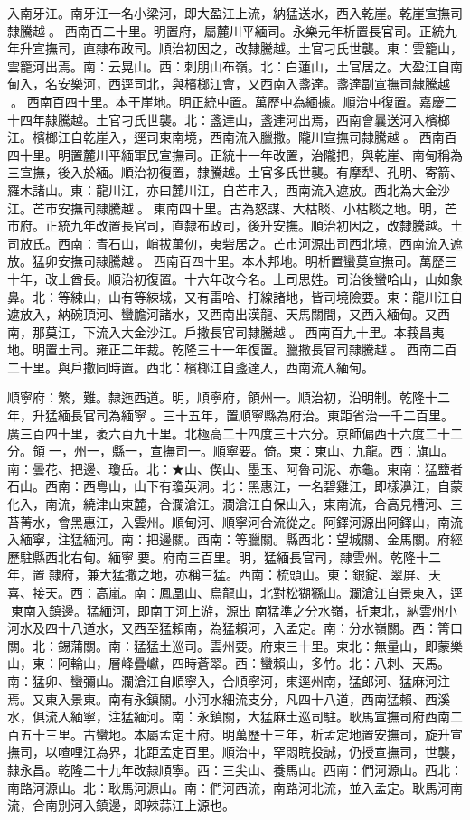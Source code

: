 \begin{pinyinscope}
入南牙江。南牙江一名小梁河，即大盈江上流，納猛送水，西入乾崖。乾崖宣撫司隸騰越。西南百二十里。明置府，屬麓川平緬司。永樂元年析置長官司。正統九年升宣撫司，直隸布政司。順治初因之，改隸騰越。土官刁氏世襲。東：雲籠山，雲籠河出焉。南：云晃山。西：刺朋山布嶺。北：白蓮山，土官居之。大盈江自南甸入，名安樂河，西逕司北，與檳榔江會，又西南入盞達。盞達副宣撫司隸騰越。西南百四十里。本干崖地。明正統中置。萬歷中為緬據。順治中復置。嘉慶二十四年隸騰越。土官刁氏世襲。北：盞達山，盞達河出焉，西南會曩送河入檳榔江。檳榔江自乾崖入，逕司東南境，西南流入臘撒。隴川宣撫司隸騰越。西南百四十里。明置麓川平緬軍民宣撫司。正統十一年改置，治隴把，與乾崖、南甸稱為三宣撫，後入於緬。順治初復置，隸騰越。土官多氏世襲。有摩犁、孔明、寄箭、羅木諸山。東：龍川江，亦曰麓川江，自芒市入，西南流入遮放。西北為大金沙江。芒市安撫司隸騰越。東南四十里。古為怒謀、大枯睒、小枯睒之地。明，芒市府。正統九年改置長官司，直隸布政司，後升安撫。順治初因之，改隸騰越。土司放氏。西南：青石山，峭拔萬仞，夷砦居之。芒市河源出司西北境，西南流入遮放。猛卯安撫司隸騰越。西南百四十里。本木邦地。明析置蠻莫宣撫司。萬歷三十年，改土酋長。順治初復置。十六年改今名。土司思姓。司治後蠻哈山，山如象鼻。北：等練山，山有等練城，又有雷哈、打線諸地，皆司境險要。東：龍川江自遮放入，納碗頂河、蠻膽河諸水，又西南出漢龍、天馬關間，又西入緬甸。又西南，那莫江，下流入大金沙江。戶撒長官司隸騰越。西南百九十里。本莪昌夷地。明置土司。雍正二年裁。乾隆三十一年復置。臘撒長官司隸騰越。西南二百二十里。與戶撒同時置。西北：檳榔江自盞達入，西南流入緬甸。

順寧府：繁，難。隸迤西道。明，順寧府，領州一。順治初，沿明制。乾隆十二年，升猛緬長官司為緬寧。三十五年，置順寧縣為府治。東距省治一千二百里。廣三百四十里，袤六百九十里。北極高二十四度三十六分。京師偏西十六度二十二分。領一，州一，縣一，宣撫司一。順寧要。倚。東：東山、九龍。西：旗山。南：曇花、把邊、瓊岳。北：★山、偰山、墨玉、阿魯司泥、赤龜。東南：猛盬者石山。西南：西粵山，山下有瓊英洞。北：黑惠江，一名碧雞江，即樣濞江，自蒙化入，南流，繞津山東麓，合瀾滄江。瀾滄江自保山入，東南流，合高見槽河、三苔菁水，會黑惠江，入雲州。順甸河、順寧河合流從之。阿鐸河源出阿鐸山，南流入緬寧，注猛緬河。南：把邊關。西南：等臘關。縣西北：望城關、金馬關。府經歷駐縣西北右甸。緬寧要。府南三百里。明，猛緬長官司，隸雲州。乾隆十二年，置隸府，兼大猛撒之地，亦稱三猛。西南：梳頭山。東：銀錠、翠屏、天喜、接天。西：高嵐。南：鳳凰山、烏龍山，北對松猢猻山。瀾滄江自景東入，逕東南入鎮邊。猛緬河，即南丁河上游，源出南猛準之分水嶺，折東北，納雲州小河水及四十八道水，又西至猛賴南，為猛賴河，入孟定。南：分水嶺關。西：箐口關。北：錫蒲關。南：猛猛土巡司。雲州要。府東三十里。東北：無量山，即蒙樂山，東：阿輪山，層峰疊巘，四時蒼翠。西：蠻賴山，多竹。北：八刺、天馬。南：猛卯、蠻彌山。瀾滄江自順寧入，合順寧河，東逕州南，猛郎河、猛麻河注焉。又東入景東。南有永鎮關。小河水細流支分，凡四十八道，西南猛賴、西溪水，俱流入緬寧，注猛緬河。南：永鎮關，大猛麻土巡司駐。耿馬宣撫司府西南二百五十三里。古蠻地。本屬孟定土府。明萬歷十三年，析孟定地置安撫司，旋升宣撫司，以喳哩江為界，北距孟定百里。順治中，罕悶睆投誠，仍授宣撫司，世襲，隸永昌。乾隆二十九年改隸順寧。西：三尖山、養馬山。西南：們河源山。西北：南路河源山。北：耿馬河源山。南：們河西流，南路河北流，並入孟定。耿馬河南流，合南別河入鎮邊，即辣蒜江上源也。


\end{pinyinscope}
